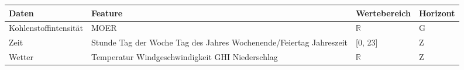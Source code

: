 \begin{tabular}{|p{4cm}|p{4cm}|p{}|p{}|}
    \hline
    Daten & Feature & Wertebereich & Horizont\tnote{a} \\ \hline \hline
    Kohlenstoffintensität & MOER & $\mathbb{R}$ & G \\ \hline
    Zeit & Stunde \newline Tag der Woche \newline Tag des Jahres \newline Wochenende/Feiertag \newline Jahreszeit & [0, 23] \newline [0, 6] \newline [1, 365] \newline [0, 1] \newline [0, 3] & Z \\ \hline
    Wetter & Temperatur \newline Windgeschwindigkeit \newline GHI \newline Niederschlag & $\mathbb{R}$ & Z\\ \hline
\end{tabular}



